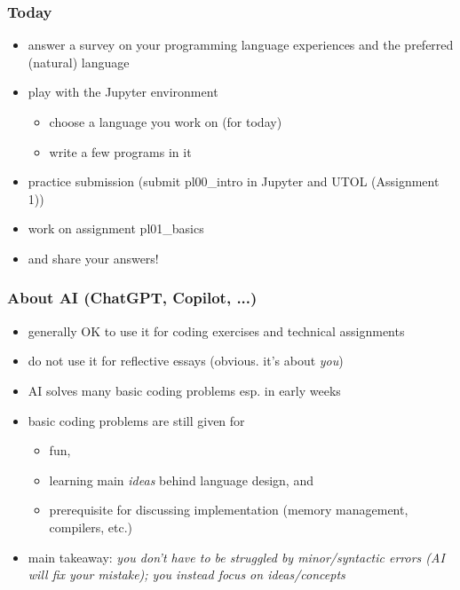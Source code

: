 \documentclass[12pt,dvipdfmx]{beamer}
\newcommand{\mura}[1]{{\color{purple}#1}}
\newcommand{\ao}[1]{{\color{blue}#1}}
\begin{document}
\begin{frame}
  \frametitle{Today}
  \begin{itemize}
  \item answer a survey on your programming language experiences
    and the preferred (natural) language
  \item play with the Jupyter environment
    \begin{itemize}
    \item choose a language you work on (for today)
    \item write a few programs in it
    \end{itemize}
  \item practice submission (submit \ao{pl00\_intro} in Jupyter and UTOL (Assignment 1))
  \item work on assignment \ao{pl01\_basics}
  \item and share your answers!
  \end{itemize}
\end{frame}

\begin{frame}
  \frametitle{About AI (ChatGPT, Copilot, ...)}
  \begin{itemize}
  \item generally \ao{OK to use it for coding exercises and technical assignments}
  \item do \mura{not} use it for reflective essays (obvious. it's about {\it you})
  \item AI solves many basic coding problems esp. in early weeks
  \item basic coding problems are still given for
    \begin{itemize}
    \item fun,
    \item learning main \ao{\it ideas} behind language design, and
    \item prerequisite for discussing implementation
      (memory management, compilers, etc.)
    \end{itemize}
  \item main takeaway:
    \ao{\it you don't have to be struggled by minor/syntactic errors
      (AI will fix your mistake); you instead focus on ideas/concepts}
  \end{itemize}
\end{frame}
\end{document}
